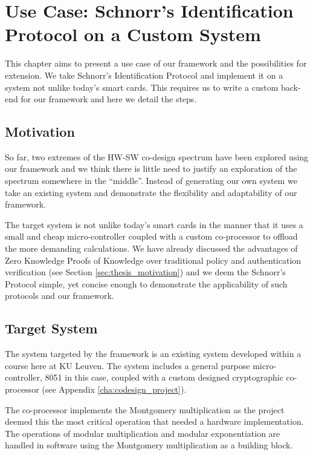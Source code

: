 \chapter{Use Case: Schnorr's Identification Protocol on a Custom System}

This chapter aims to present a use case of our framework and the
possibilities for extension. We take Schnorr's Identification Protocol
and implement it on a system not unlike today's smart cards. This
requires us to write a custom back-end for our framework and here we
detail the steps.

\section{Motivation}

So far, two extremes of the HW-SW co-design spectrum have been
explored using our framework and we think there is little need to
justify an exploration of the spectrum somewhere in the ``middle''.
Instead of generating our own system we take an existing system and
demonstrate the flexibility and adaptability of our framework.

The target system is not unlike today's smart cards in the manner that
it uses a small and cheap micro-controller coupled with a custom
co-processor to offload the more demanding calculations. We have
already discussed the advantages of Zero Knowledge Proofs of Knowledge
over traditional policy and authentication verification (see Section
\ref{sec:thesis_motivation}) and we deem the Schnorr's Protocol simple,
yet concise enough to demonstrate the applicability of such protocols
and our framework.

\section{Target System}

The system targeted by the framework is an existing system developed
within a course here at KU Leuven. The system includes a general
purpose micro-controller, 8051 in this case, coupled with a custom
designed cryptographic co-processor (see Appendix
\ref{cha:codesign_project}).

The co-processor implements the Montgomery multiplication as the
project deemed this the most critical operation that needed a hardware
implementation. The operations of modular multiplication and modular
exponentiation are handled in software using the Montgomery
multiplication as a building block.

